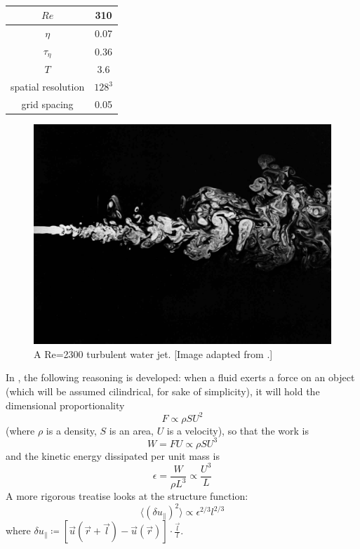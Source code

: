 \begin{table}
\centering
\begin{tabular}{c|c}
$Re$ & 310 \\ \hline
$\eta$ & 0.07 \\ \hline
$\tau_\eta$ & 0.36 \\ \hline
$T$ & 3.6 \\ \hline
spatial resolution & $128^3$ \\ \hline
grid spacing & 0.05 
\end{tabular}
\caption{}
\label{tab:3dparam}
\end{table}

\begin{figure}
    \centering
    \includegraphics[width=\textwidth]{img/turb_flow_VanDyke}
    \caption{A Re=2300 turbulent water jet. [Image adapted from \autocite{van1982album}.]}
    \label{fig:vandyke}
\end{figure}

In \autocite[chapter 5.2]{frisch}, the following reasoning is developed: when a fluid exerts a force on an object (which will be assumed cilindrical, for sake of simplicity), it will hold the dimensional proportionality
\[ F \propto \rho S U^2 \]
(where $\rho$ is a density, $S$ is an area, $U$ is a velocity), so that the work is
\[ W = FU \propto \rho S U^3 \]
and the kinetic energy dissipated per unit mass is
\[ \epsilon = \frac{W}{\rho L^3 } \propto \frac{U^3}{L} \]
A more rigorous treatise looks at the structure function:
\[ \langle \left( \delta u_\parallel \right)^2 \rangle \propto \epsilon^{2/3} l^{2/3} \]
where \( \delta u_\parallel \coloneqq \left[\vec{u}(\vec{r}+\vec{l}) - \vec{u}(\vec{r})\right]\cdot \frac{\vec{l}}{l} \). 

